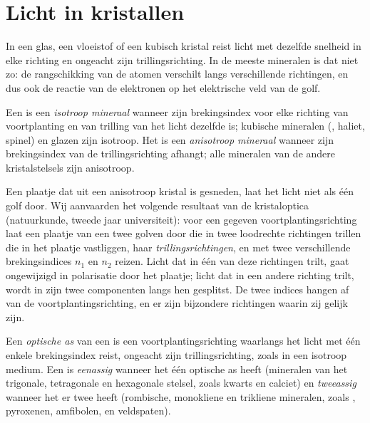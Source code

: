 \section{Licht in kristallen}

In een glas, een vloeistof of een kubisch kristal reist licht met dezelfde snelheid in elke richting en ongeacht zijn trillingsrichting.
In de meeste mineralen is dat niet zo: de rangschikking van de atomen verschilt langs verschillende richtingen, en dus ook de reactie van de
elektronen op het elektrische veld van de golf.

\begin{definition}\label{def:b1:optical-mineralogy:anisotropic}
Een  is een \emph{isotroop mineraal} wanneer zijn brekingsindex voor elke richting van voortplanting en
van trilling van het licht dezelfde is; kubische mineralen (, haliet, spinel) en glazen zijn isotroop. Het is een
\emph{anisotroop mineraal} wanneer zijn brekingsindex van de trillingsrichting afhangt; alle mineralen van de
andere kristalstelsels zijn anisotroop.
\end{definition}
Een plaatje dat uit een anisotroop kristal is gesneden, laat het licht niet als één golf door. Wij aanvaarden het volgende resultaat van de
kristaloptica (natuurkunde, tweede jaar universiteit): voor een gegeven voortplantingsrichting laat een plaatje van een 
twee golven door die in twee loodrechte richtingen trillen die in het plaatje vastliggen, haar \emph{trillingsrichtingen}, en met twee
verschillende brekingsindices $n_1$ en $n_2$ reizen. Licht dat in één van deze richtingen trilt, gaat ongewijzigd in polarisatie door het
plaatje; licht dat in een andere richting trilt, wordt in zijn twee componenten langs hen gesplitst. De twee indices hangen af van de
voortplantingsrichting, en er zijn bijzondere richtingen waarin zij gelijk zijn.

\begin{definition}\label{def:b1:optical-mineralogy:optic-axis}
Een \emph{optische as} van een  is een voortplantingsrichting waarlangs het licht met één
enkele brekingsindex reist, ongeacht zijn trillingsrichting, zoals in een isotroop medium. Een  is \emph{eenassig}
wanneer het één optische as heeft (mineralen van het trigonale, tetragonale en hexagonale stelsel, zoals kwarts en calciet) en
\emph{tweeassig} wanneer het er twee heeft (rombische, monokliene en trikliene mineralen, zoals , pyroxenen,
amfibolen,  en veldspaten).
\end{definition}

